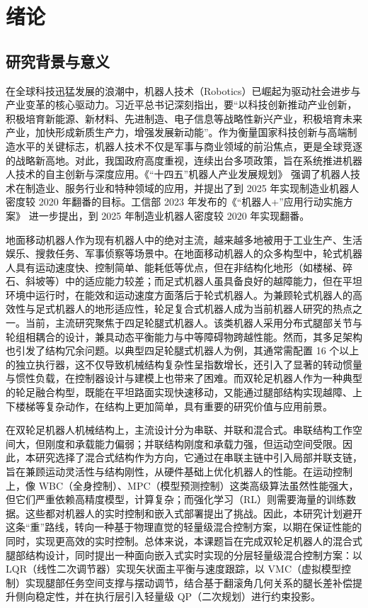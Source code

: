 \chapter{绪论}\label{chap:introduction}

\section{研究背景与意义}

在全球科技迅猛发展的浪潮中，机器人技术（Robotics）已崛起为驱动社会进步与产业变革的核心驱动力。习近平总书记深刻指出，要“以科技创新推动产业创新，积极培育新能源、新材料、先进制造、电子信息等战略性新兴产业，积极培育未来产业，加快形成新质生产力，增强发展新动能”。作为衡量国家科技创新与高端制造水平的关键标志，机器人技术不仅是军事与商业领域的前沿焦点，更是全球竞逐的战略新高地。对此，我国政府高度重视，连续出台多项政策，旨在系统推进机器人技术的自主创新与深度应用。《“十四五”机器人产业发展规划》\cite{miit2021} 强调了机器人技术在制造业、服务行业和特种领域的应用，并提出了到 2025 年实现制造业机器人密度较 2020 年翻番的目标。工信部 2023 年发布的《“机器人+”应用行动实施方案》\cite{miit2023} 进一步提出，到 2025 年制造业机器人密度较 2020 年实现翻番。

地面移动机器人作为现有机器人中的绝对主流，越来越多地被用于工业生产、生活娱乐、搜救任务、军事侦察等场景中。在地面移动机器人的众多构型中，轮式机器人具有运动速度快、控制简单、能耗低等优点，但在非结构化地形（如楼梯、碎石、斜坡等）中的适应能力较差；而足式机器人虽具备良好的越障能力，但在平坦环境中运行时，在能效和运动速度方面落后于轮式机器人。为兼顾轮式机器人的高效性与足式机器人的地形适应性，轮足复合式机器人成为当前机器人研究的热点之一\cite{ding2024}。当前，主流研究聚焦于四足轮腿式机器人\cite{hutter2016}。该类机器人采用分布式腿部关节与轮组相耦合的设计，兼具动态平衡能力与中等障碍物跨越性能。然而，其多足架构也引发了结构冗余问题。以典型四足轮腿式机器人为例，其通常需配置 16 个以上的独立执行器，这不仅导致机械结构复杂性呈指数增长，还引入了显著的转动惯量与惯性负载，在控制器设计与建模上也带来了困难。而双轮足机器人作为一种典型的轮足融合构型，既能在平坦路面实现快速移动，又能通过腿部结构实现越障、上下楼梯等复杂动作，在结构上更加简单，具有重要的研究价值与应用前景。

在双轮足机器人机械结构上，主流设计分为串联、并联和混合式。串联结构工作空间大，但刚度和承载能力偏弱；并联结构刚度和承载力强，但运动空间受限。因此，本研究选择了混合式结构作为方向，它通过在串联主链中引入局部并联支链，旨在兼顾运动灵活性与结构刚性，从硬件基础上优化机器人的性能。在运动控制上，像 WBC（全身控制）、MPC（模型预测控制）这类高级算法虽然性能强大，但它们严重依赖高精度模型，计算复杂；而强化学习（RL）则需要海量的训练数据。这些都对机器人的实时控制和嵌入式部署提出了挑战。因此，本研究计划避开这条“重”路线，转向一种基于物理直觉的轻量级混合控制方案，以期在保证性能的同时，实现更高效的实时控制。总体来说，本课题旨在完成双轮足机器人的混合式腿部结构设计，同时提出一种面向嵌入式实时实现的分层轻量级混合控制方案：以 LQR（线性二次调节器）实现矢状面主平衡与速度跟踪，以 VMC（虚拟模型控制）实现腿部任务空间支撑与摆动调节，结合基于翻滚角几何关系的腿长差补偿提升侧向稳定性，并在执行层引入轻量级 QP（二次规划）进行约束投影。

